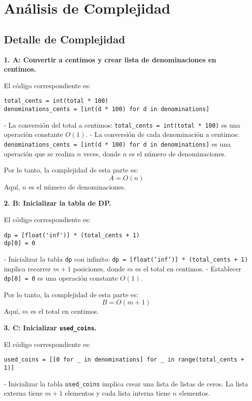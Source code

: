 \section*{Análisis de Complejidad}



\subsection*{Detalle de Complejidad}

\textbf{1. A: Convertir a centimos y crear lista de denominaciones en centimos.}

El código correspondiente es:
\begin{lstlisting}
total_cents = int(total * 100)
denominations_cents = [int(d * 100) for d in denominations]
\end{lstlisting}

- La conversión del total a centimos: \texttt{total\_cents = int(total * 100)} es una operación constante \( O(1) \).
- La conversión de cada denominación a centimos: \texttt{denominations\_cents = [int(d * 100) for d in denominations]} es una operación que se realiza \( n \) veces, donde \( n \) es el número de denominaciones.

Por lo tanto, la complejidad de esta parte es:
\[ A = O(n) \]
Aquí, \( n \) es el número de denominaciones.

\textbf{2. B: Inicializar la tabla de DP.}

El código correspondiente es:
\begin{lstlisting}
dp = [float('inf')] * (total_cents + 1)
dp[0] = 0
\end{lstlisting}

- Inicializar la tabla \texttt{dp} con infinito: \texttt{dp = [float('inf')] * (total\_cents + 1)} implica recorrer \( m+1 \) posiciones, donde \( m \) es el total en centimos.
- Establecer \texttt{dp[0] = 0} es una operación constante \( O(1) \).

Por lo tanto, la complejidad de esta parte es:
\[ B = O(m+1) \]
Aquí, \( m \) es el total en centimos.

\textbf{3. C: Inicializar \texttt{used\_coins}.}

El código correspondiente es:
\begin{lstlisting}
used_coins = [[0 for _ in denominations] for _ in range(total_cents + 1)]
\end{lstlisting}

- Inicializar la tabla \texttt{used\_coins} implica crear una lista de listas de ceros. La lista externa tiene \( m+1 \) elementos y cada lista interna tiene \( n \) elementos.

